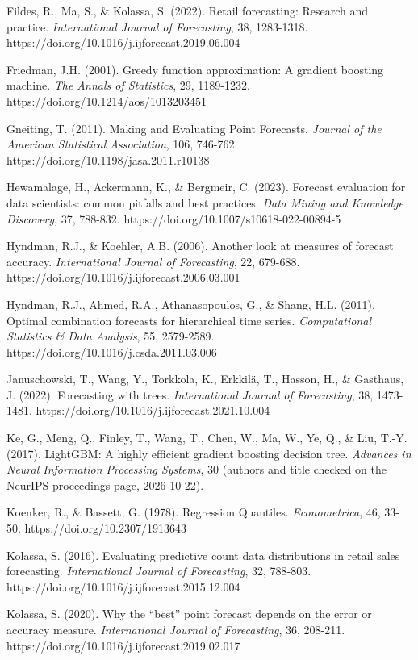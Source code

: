 \documentclass[
]{article}
\begin{document}
Fildes, R., Ma, S., \& Kolassa, S. (2022). Retail forecasting: Research
and practice. \emph{International Journal of Forecasting}, 38,
1283-1318. https://doi.org/10.1016/j.ijforecast.2019.06.004

Friedman, J.H. (2001). Greedy function approximation: A gradient
boosting machine. \emph{The Annals of Statistics}, 29, 1189-1232.
https://doi.org/10.1214/aos/1013203451

Gneiting, T. (2011). Making and Evaluating Point Forecasts.
\emph{Journal of the American Statistical Association}, 106, 746-762.
https://doi.org/10.1198/jasa.2011.r10138

Hewamalage, H., Ackermann, K., \& Bergmeir, C. (2023). Forecast
evaluation for data scientists: common pitfalls and best practices.
\emph{Data Mining and Knowledge Discovery}, 37, 788-832.
https://doi.org/10.1007/s10618-022-00894-5

Hyndman, R.J., \& Koehler, A.B. (2006). Another look at measures of
forecast accuracy. \emph{International Journal of Forecasting}, 22,
679-688. https://doi.org/10.1016/j.ijforecast.2006.03.001

Hyndman, R.J., Ahmed, R.A., Athanasopoulos, G., \& Shang, H.L. (2011).
Optimal combination forecasts for hierarchical time series.
\emph{Computational Statistics \& Data Analysis}, 55, 2579-2589.
https://doi.org/10.1016/j.csda.2011.03.006

Januschowski, T., Wang, Y., Torkkola, K., Erkkilä, T., Hasson, H., \&
Gasthaus, J. (2022). Forecasting with trees. \emph{International Journal
of Forecasting}, 38, 1473-1481.
https://doi.org/10.1016/j.ijforecast.2021.10.004

Ke, G., Meng, Q., Finley, T., Wang, T., Chen, W., Ma, W., Ye, Q., \&
Liu, T.-Y. (2017). LightGBM: A highly efficient gradient boosting
decision tree. \emph{Advances in Neural Information Processing Systems},
30 (authors and title checked on the NeurIPS proceedings page,
2026-10-22).

Koenker, R., \& Bassett, G. (1978). Regression Quantiles.
\emph{Econometrica}, 46, 33-50. https://doi.org/10.2307/1913643

Kolassa, S. (2016). Evaluating predictive count data distributions in
retail sales forecasting. \emph{International Journal of Forecasting},
32, 788-803. https://doi.org/10.1016/j.ijforecast.2015.12.004

Kolassa, S. (2020). Why the ``best'' point forecast depends on the error
or accuracy measure. \emph{International Journal of Forecasting}, 36,
208-211. https://doi.org/10.1016/j.ijforecast.2019.02.017
\end{document}
